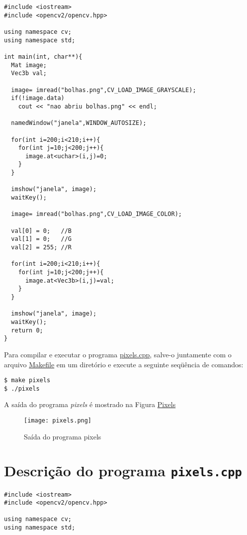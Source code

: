 \documentclass[11pt]{amsbook}
\begin{document}
\begin{verbatim}
#include <iostream>
#include <opencv2/opencv.hpp>

using namespace cv;
using namespace std;

int main(int, char**){
  Mat image;
  Vec3b val;

  image= imread("bolhas.png",CV_LOAD_IMAGE_GRAYSCALE);
  if(!image.data)
    cout << "nao abriu bolhas.png" << endl;

  namedWindow("janela",WINDOW_AUTOSIZE);

  for(int i=200;i<210;i++){
    for(int j=10;j<200;j++){
      image.at<uchar>(i,j)=0;
    }
  }

  imshow("janela", image);
  waitKey();

  image= imread("bolhas.png",CV_LOAD_IMAGE_COLOR);

  val[0] = 0;   //B
  val[1] = 0;   //G
  val[2] = 255; //R

  for(int i=200;i<210;i++){
    for(int j=10;j<200;j++){
      image.at<Vec3b>(i,j)=val;
    }
  }

  imshow("janela", image);
  waitKey();
  return 0;
}
\end{verbatim}

Para compilar e executar o programa
\href{exemplos/pixels.cpp}{pixels.cpp}, salve-o juntamente com o arquivo
\href{exemplos/Makefile}{Makefile} em um diretório e execute a seguinte
seqüência de comandos:


\begin{verbatim}
$ make pixels
$ ./pixels
\end{verbatim}

A saída do programa \emph{pixels} é mostrado na Figura \hyperlink{fig-pixels}{Pixels}


\begin{figure}[h]{}
\centering\texttt{[image: pixels.png]}
\caption{Saída do programa pixels}

\end{figure}

\hypertarget{x-descrição-do-programa-\texttt{pixels.cpp}}{\section{Descrição do programa \texttt{pixels.cpp}}}
\begin{verbatim}
#include <iostream>
#include <opencv2/opencv.hpp>

using namespace cv;
using namespace std;
\end{verbatim}
\end{document}
